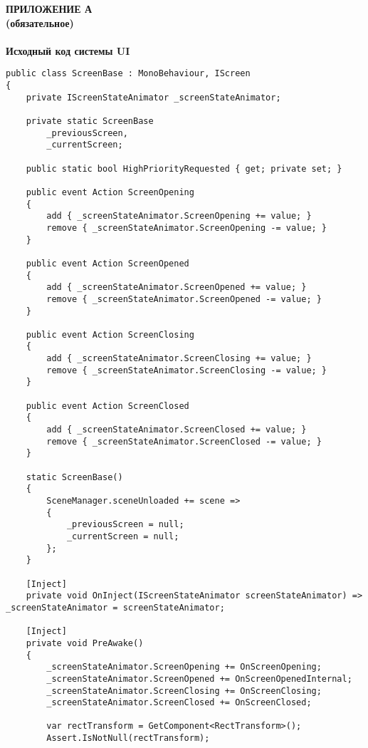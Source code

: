 \newpage
{}
{}
\begin{center}
  \textbf{\MakeUppercase{Приложение А}\\
          (обязательное)\\~\\
          Исходный код системы UI}
\end{center}

\begin{lstlisting}
public class ScreenBase : MonoBehaviour, IScreen
{
    private IScreenStateAnimator _screenStateAnimator;

    private static ScreenBase
        _previousScreen,
        _currentScreen;

    public static bool HighPriorityRequested { get; private set; }

    public event Action ScreenOpening
    {
        add { _screenStateAnimator.ScreenOpening += value; }
        remove { _screenStateAnimator.ScreenOpening -= value; }
    }

    public event Action ScreenOpened
    {
        add { _screenStateAnimator.ScreenOpened += value; }
        remove { _screenStateAnimator.ScreenOpened -= value; }
    }

    public event Action ScreenClosing
    {
        add { _screenStateAnimator.ScreenClosing += value; }
        remove { _screenStateAnimator.ScreenClosing -= value; }
    }

    public event Action ScreenClosed
    {
        add { _screenStateAnimator.ScreenClosed += value; }
        remove { _screenStateAnimator.ScreenClosed -= value; }
    }

    static ScreenBase()
    {
        SceneManager.sceneUnloaded += scene =>
        {
            _previousScreen = null;
            _currentScreen = null;
        };
    }

    [Inject]
    private void OnInject(IScreenStateAnimator screenStateAnimator) => _screenStateAnimator = screenStateAnimator;

    [Inject]
    private void PreAwake()
    {
        _screenStateAnimator.ScreenOpening += OnScreenOpening;
        _screenStateAnimator.ScreenOpened += OnScreenOpenedInternal;
        _screenStateAnimator.ScreenClosing += OnScreenClosing;
        _screenStateAnimator.ScreenClosed += OnScreenClosed;

        var rectTransform = GetComponent<RectTransform>();
        Assert.IsNotNull(rectTransform);


\end{lstlisting}
